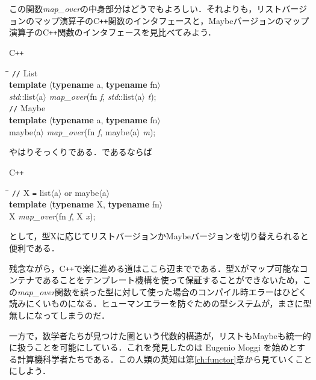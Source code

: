 \documentclass[twocolumn]{jsbook}
\newcommand{\cxx}{\textrm{C}\texttt{++}}
\newenvironment{cxxcode}{\begin{itembox}[r]{\cxx}}{\end{itembox}}
\newenvironment{python}{\begin{tabbing}\hspace*{1em}\=\hspace*{1em}\=\hspace*{1em}\=\hspace*{1em}\=\kill}{\end{tabbing}}
\newcommand{\pthnClassname}[1]{\textrm{#1}}
\newcommand{\pthnId}[1]{\textit{#1}}
\newcommand{\pthnKeyword}[1]{\textbf{#1}}
\newcommand{\pthnOp}[1]{\texttt{#1}}
\begin{document}
この関数\pthnId{map\_over}の中身部分はどうでもよろしい．それよりも，リストバージョンのマップ演算子の\cxx 関数のインタフェースと，Maybeバージョンのマップ演算子の\cxx 関数のインタフェースを見比べてみよう．
\begin{cxxcode}
\begin{python}
\verb|//| List\\
\pthnKeyword{template} $\langle$\pthnKeyword{typename} \pthnClassname{a}, \pthnKeyword{typename} \pthnClassname{fn}$\rangle$\\
\pthnId{std}::\pthnClassname{list}$\langle$\pthnClassname{a}$\rangle$ \pthnId{map\_over}(\pthnClassname{fn} \pthnId{f}, \pthnId{std}::\pthnClassname{list}$\langle$\pthnClassname{a}$\rangle$ \pthnId{t});\\
\verb|//| Maybe\\
\pthnKeyword{template} $\langle$\pthnKeyword{typename} \pthnClassname{a}, \pthnKeyword{typename} \pthnClassname{fn}$\rangle$\\
\pthnClassname{maybe}$\langle$\pthnClassname{a}$\rangle$ \pthnId{map\_over}(\pthnClassname{fn} \pthnId{f}, \pthnClassname{maybe}$\langle$\pthnClassname{a}$\rangle$ \pthnId{m});
\end{python}
\end{cxxcode}
やはりそっくりである．であるならば
\begin{cxxcode}
\begin{python}
\verb|//| \pthnClassname{X} \pthnOp{=} \pthnClassname{list}$\langle$\pthnClassname{a}$\rangle$ or \pthnClassname{maybe}$\langle$\pthnClassname{a}$\rangle$ \\
\pthnKeyword{template} $\langle$\pthnKeyword{typename} \pthnClassname{X}, \pthnKeyword{typename} \pthnClassname{fn}$\rangle$\\
\pthnClassname{X} \pthnId{map\_over}(\pthnClassname{fn} \pthnId{f}, \pthnClassname{X} \pthnId{x});
\end{python}
\end{cxxcode}
として，型\pthnClassname{X}に応じてリストバージョンかMaybeバージョンを切り替えられると便利である．

残念ながら，\cxx で楽に進める道はここら辺までである．型\pthnClassname{X}がマップ可能なコンテナであることをテンプレート機構を使って保証することができないため，この\pthnId{map\_over}関数を誤った型に対して使った場合のコンパイル時エラーはひどく読みにくいものになる．ヒューマンエラーを防ぐための型システムが，まさに型無しになってしまうのだ．

一方で，数学者たちが見つけた圏という代数的構造が，リストもMaybeも統一的に扱うことを可能にしている．これを発見したのは Eugenio Moggi を始めとする計算機科学者たちである．この人類の英知は第\ref{ch:functor}章から見ていくことにしよう．
\end{document}

